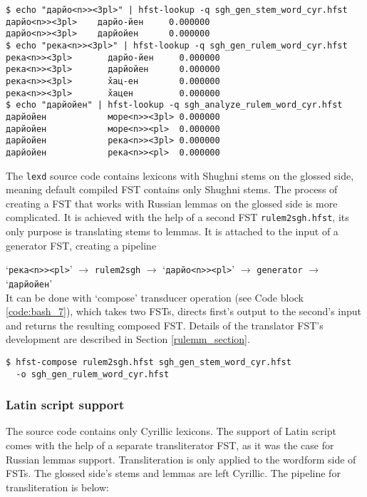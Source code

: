 \begin{code_frame}[float]
    \begin{verbatim}
$ echo "дарйо<n>><3pl>" | hfst-lookup -q sgh_gen_stem_word_cyr.hfst
дарйо<n>><3pl>	  дарйо-йен     0.000000
дарйо<n>><3pl>	  дарйойен      0.000000
$ echo "река<n>><3pl>" | hfst-lookup -q sgh_gen_rulem_word_cyr.hfst
река<n>><3pl>	    дарйо-йен     0.000000
река<n>><3pl>	    дарйойен      0.000000
река<n>><3pl>	    х̌ац-ен        0.000000
река<n>><3pl>	    х̌ацен         0.000000
$ echo "дарйойен" | hfst-lookup -q sgh_analyze_rulem_word_cyr.hfst
дарйойен	        море<n>><3pl> 0.000000
дарйойен	        море<n>><pl>  0.000000
дарйойен	        река<n>><3pl> 0.000000
дарйойен	        река<n>><pl>  0.000000
    \end{verbatim}
    \tcblower
    \label{code:pipeline_3}
\end{code_frame}

The \texttt{lexd} source code contains lexicons with Shughni stems on the glossed side, meaning default compiled FST contains only Shughni stems. The process of creating a FST that works with Russian lemmas on the glossed side is more complicated. It is achieved with the help of a second FST \texttt{rulem2sgh.hfst}, its only purpose is translating stems to lemmas. It is attached to the input of a generator FST, creating a pipeline 

\vspace*{0.3cm}
\noindent `\texttt{река<n>><pl>}' $\rightarrow$ \texttt{rulem2sgh} $\rightarrow$ `\texttt{дарйо<n>><pl>}' $\rightarrow$ \texttt{generator} $\rightarrow$ `\texttt{дарйойен}'\\


It can be done with `compose' transducer operation (see Code block \ref{code:bash_7}), which takes two FSTs, directs first's output to the second's input and returns the resulting composed FST. Details of the translator FST's development are described in Section \ref{rulemm_section}.

\begin{code_frame}[float]
    \begin{verbatim}
$ hfst-compose rulem2sgh.hfst sgh_gen_stem_word_cyr.hfst
  -o sgh_gen_rulem_word_cyr.hfst
    \end{verbatim}
    \tcblower
    \label{code:bash_7}
\end{code_frame}

\subsubsection*{Latin script support}
The source code contains only Cyrillic lexicons. The support of Latin script comes with the help of a separate transliterator FST, as it was the case for Russian lemmas support. Transliteration is only applied to the wordform side of FSTs. The glossed side's stems and lemmas are left Cyrillic. The pipeline for transliteration is below:

